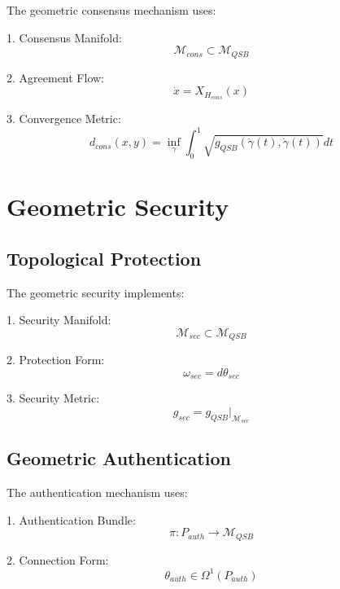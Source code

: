 \documentclass[12pt]{article}
\begin{document}
The geometric consensus mechanism uses:

1. Consensus Manifold:
\begin{equation}
\mathcal{M}_{cons} \subset \mathcal{M}_{QSB}
\end{equation}

2. Agreement Flow:
\begin{equation}
\dot{x} = X_{H_{cons}}(x)
\end{equation}

3. Convergence Metric:
\begin{equation}
d_{cons}(x,y) = \inf_γ \int_0^1 \sqrt{g_{QSB}(\dot{γ}(t),\dot{γ}(t))} dt
\end{equation}

\section{Geometric Security}

\subsection{Topological Protection}

The geometric security implements:

1. Security Manifold:
\begin{equation}
\mathcal{M}_{sec} \subset \mathcal{M}_{QSB}
\end{equation}

2. Protection Form:
\begin{equation}
ω_{sec} = dθ_{sec}
\end{equation}

3. Security Metric:
\begin{equation}
g_{sec} = g_{QSB}|_{\mathcal{M}_{sec}}
\end{equation}

\subsection{Geometric Authentication}

The authentication mechanism uses:

1. Authentication Bundle:
\begin{equation}
π: P_{auth} \rightarrow \mathcal{M}_{QSB}
\end{equation}

2. Connection Form:
\begin{equation}
θ_{auth} \in Ω^1(P_{auth})
\end{equation}
\end{document}
